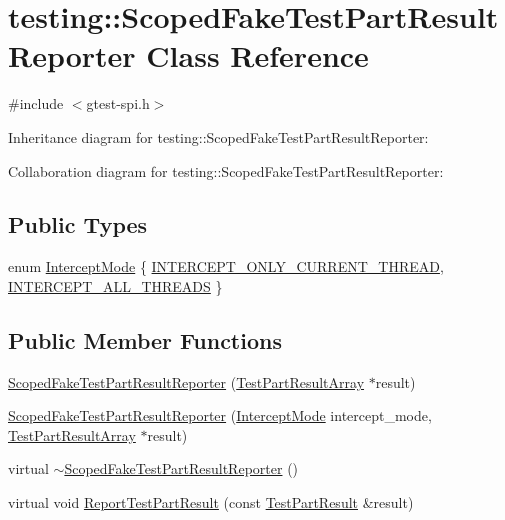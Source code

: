 \hypertarget{classtesting_1_1_scoped_fake_test_part_result_reporter}{}\section{testing\+:\+:Scoped\+Fake\+Test\+Part\+Result\+Reporter Class Reference}
\label{classtesting_1_1_scoped_fake_test_part_result_reporter}


{\ttfamily \#include $<$gtest-\/spi.\+h$>$}



Inheritance diagram for testing\+:\+:Scoped\+Fake\+Test\+Part\+Result\+Reporter\+:


Collaboration diagram for testing\+:\+:Scoped\+Fake\+Test\+Part\+Result\+Reporter\+:
\subsection*{Public Types}
\begin{DoxyCompactItemize}
\item 
enum \hyperlink{classtesting_1_1_scoped_fake_test_part_result_reporter_a82f6209b3cf5c4b15ec8bd8041dbc2d5}{Intercept\+Mode} \{ \hyperlink{classtesting_1_1_scoped_fake_test_part_result_reporter_a82f6209b3cf5c4b15ec8bd8041dbc2d5aed6c5f87d33207768db503526e6a1e8a}{I\+N\+T\+E\+R\+C\+E\+P\+T\+\_\+\+O\+N\+L\+Y\+\_\+\+C\+U\+R\+R\+E\+N\+T\+\_\+\+T\+H\+R\+E\+AD}, 
\hyperlink{classtesting_1_1_scoped_fake_test_part_result_reporter_a82f6209b3cf5c4b15ec8bd8041dbc2d5a187f4164aad7fbb9414b263c68a693cd}{I\+N\+T\+E\+R\+C\+E\+P\+T\+\_\+\+A\+L\+L\+\_\+\+T\+H\+R\+E\+A\+DS}
 \}
\end{DoxyCompactItemize}
\subsection*{Public Member Functions}
\begin{DoxyCompactItemize}
\item 
\hyperlink{classtesting_1_1_scoped_fake_test_part_result_reporter_aa0100ecf4799fb51d45167be6a5de1d5}{Scoped\+Fake\+Test\+Part\+Result\+Reporter} (\hyperlink{classtesting_1_1_test_part_result_array}{Test\+Part\+Result\+Array} $\ast$result)
\item 
\hyperlink{classtesting_1_1_scoped_fake_test_part_result_reporter_a57cbc09ed48627c8a73e622618dc4b4f}{Scoped\+Fake\+Test\+Part\+Result\+Reporter} (\hyperlink{classtesting_1_1_scoped_fake_test_part_result_reporter_a82f6209b3cf5c4b15ec8bd8041dbc2d5}{Intercept\+Mode} intercept\+\_\+mode, \hyperlink{classtesting_1_1_test_part_result_array}{Test\+Part\+Result\+Array} $\ast$result)
\item 
virtual \hyperlink{classtesting_1_1_scoped_fake_test_part_result_reporter_a4817d59ca70228ebd5d5c3c4e8dd729d}{$\sim$\+Scoped\+Fake\+Test\+Part\+Result\+Reporter} ()
\item 
virtual void \hyperlink{classtesting_1_1_scoped_fake_test_part_result_reporter_a82531434f51632d98ed7cdcdb10b8b92}{Report\+Test\+Part\+Result} (const \hyperlink{classtesting_1_1_test_part_result}{Test\+Part\+Result} \&result)
\end{DoxyCompactItemize}


